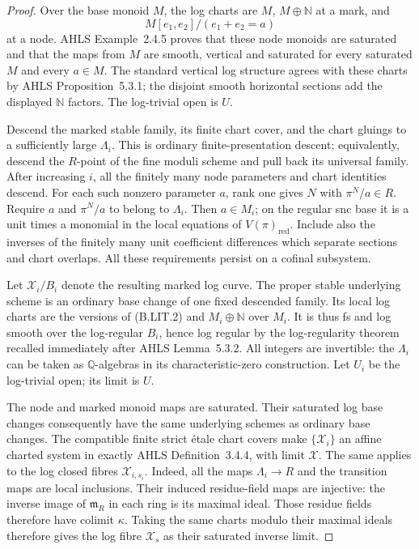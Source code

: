 \begin{proof}
Over the base monoid $M$, the log charts are $M$, $M\oplus\mathbb N$
at a mark, and
\[
       M[e_1,e_2]/(e_1+e_2=a)
                                                        \tag{B.LIT.2}
\]
at a node. AHLS Example~2.4.5 proves that these node monoids are
saturated and that the maps from $M$ are smooth, vertical and
saturated for every saturated $M$ and every $a\in M$.
The standard vertical log structure agrees with these charts by
AHLS Proposition~5.3.1; the disjoint smooth horizontal sections
add the displayed $\mathbb N$ factors. The log-trivial open is $U$.

Descend the marked stable family, its finite chart cover, and the
chart gluings to a sufficiently large $\Lambda_i$. This is ordinary
finite-presentation descent; equivalently, descend the $R$-point
of the fine moduli scheme and pull back its universal family.
After increasing $i$, all the finitely many node parameters and
chart identities descend. For each such nonzero parameter $a$,
rank one gives $N$ with $\pi^N/a\in R$. Require $a$ and
$\pi^N/a$ to belong to $\Lambda_i$. Then $a\in M_i$; on the
regular snc base it is a unit times a monomial in the local
equations of $V(\pi)_{\mathrm{red}}$. Include also the inverses
of the finitely many unit coefficient differences which separate
sections and chart overlaps. All these requirements persist on a
cofinal subsystem.

Let $\mathscr X_i/B_i$ denote the resulting marked log curve.
The proper stable underlying scheme is an ordinary base change
of one fixed descended family. Its local log charts are the
versions of (B.LIT.2) and $M_i\oplus\mathbb N$ over $M_i$.
It is thus fs and log smooth over the log-regular $B_i$, hence
log regular by the log-regularity theorem recalled immediately
after AHLS Lemma~5.3.2. All integers are invertible: the
$\Lambda_i$ can be taken as $\mathbb Q$-algebras in its
characteristic-zero construction. Let $U_i$ be the log-trivial
open; its limit is $U$.

The node and marked monoid maps are saturated. Their saturated
log base changes consequently have the same underlying schemes
as ordinary base changes. The compatible finite strict \'etale
chart covers make $\{\mathscr X_i\}$ an affine charted system
in exactly AHLS Definition~3.4.4, with limit $\mathscr X$.
The same applies to the log closed fibres
$\mathscr X_{i,s_i}$. Indeed, all the maps $\Lambda_i\to R$
and the transition maps are local inclusions. Their induced
residue-field maps are injective: the inverse image of
$\mathfrak m_R$ in each ring is its maximal ideal. Those
residue fields therefore have colimit $\kappa$. Taking the same charts modulo their maximal
ideals therefore gives the log fibre $\mathscr X_s$ as their
saturated inverse limit.


\end{proof}
